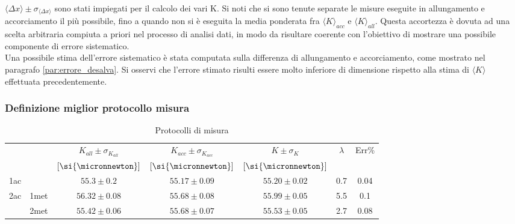 \documentclass[a4paper,11pt,oneside]{article}
\begin{document}
$\langle \Delta x \rangle \pm \sigma_{\langle \Delta x \rangle}$ sono stati impiegati per il calcolo dei vari K. Si noti che si sono tenute separate le misure eseguite in allungamento e accorciamento il più possibile, fino a quando non si è eseguita la media ponderata  fra ${\langle K \rangle}_{acc}$ e ${\langle K \rangle}_{all}$. Questa accortezza è dovuta ad una scelta arbitraria compiuta a priori nel processo di analisi dati, in modo da risultare coerente con l'obiettivo di mostrare una possibile componente di errore sistematico.\\

Una possibile stima dell'errore sistematico è stata computata sulla differenza di allungamento e accorciamento, come mostrato nel paragrafo \ref{par:errore_desalva}. Si osservi che l'errore stimato risulti essere molto inferiore di dimensione rispetto alla stima di $\langle K \rangle$ effettuata precedentemente. 

\subsubsection*{Definizione miglior protocollo misura}

\begin{table}[h!]
    \centering
    \begin{tabular}{|c|c|c|c|c|c|c|}
        \hline
        \multicolumn{2}{|c|}{} &$K_{all}\pm\sigma_{K_{all}}$& $K_{acc}\pm\sigma_{K_{acc}}$& $K \pm \sigma_K$ & \multirow{2}{*}{$\lambda$} & \multirow{2}{*}{Err\%}\\ 
        \multicolumn{2}{|c|}{} & $[\si{\micronnewton}]$ & $[\si{\micronnewton}]$ &$[\si{\micronnewton}]$ & &\\ \hline
        \multicolumn{2}{|l|}{1ac} &{\cellcolor[rgb]{0.85,0.85,0.85}}$55.3\pm0.2$ &{\cellcolor[rgb]{0.85,0.85,0.85}}$55.17\pm0.09$ &{\cellcolor[rgb]{0.85,0.85,0.85}} $55.20\pm0.02$ &{\cellcolor[rgb]{0.85,0.85,0.85}} 0.7 &{\cellcolor[rgb]{0.85,0.85,0.85}} 0.04\\ \hline
        \multirow{2}{*}{2ac} & 1met & $56.32\pm0.08$ & $55.68\pm0.08$ & $55.99\pm0.05$ & 5.5 & 0.1\\ \cline{2-7}
         & 2met &{\cellcolor[rgb]{0.85,0.85,0.85}} $55.42\pm0.06$ &{\cellcolor[rgb]{0.85,0.85,0.85}} $55.68\pm0.07$ & {\cellcolor[rgb]{0.85,0.85,0.85}} $55.53\pm0.05$ &{\cellcolor[rgb]{0.85,0.85,0.85}} 2.7 &{\cellcolor[rgb]{0.85,0.85,0.85}} 0.08\\ \hline
    \end{tabular}
    \caption{Protocolli di misura}
    \label{tab:protocolli}
\end{table}
\end{document}
